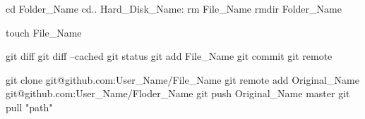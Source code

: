 
cd Folder_Name
cd..
Hard_Disk_Name:
rm File_Name
rmdir Folder_Name

touch File_Name

git diff
git diff --cached
git status
git add File_Name
git commit
git remote

git clone git@github.com:User_Name/File_Name
git remote add Original_Name git@github.com:User_Name/Floder_Name
git push Original_Name master
git pull "path"
